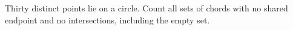 Thirty distinct points lie on a circle. Count all sets of chords with no shared endpoint and no intersections, including the empty set.
